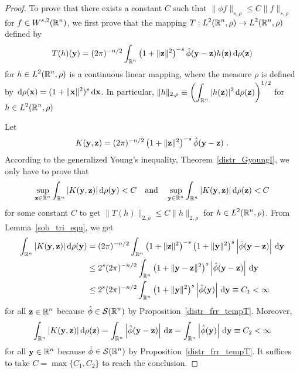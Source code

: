 \begin{proof}
To prove that there exists a constant $C$ such that
$\displaystyle \|\phi f \|_{s,\rho} \leq C \|f\|_{s,\rho}$ for
$\displaystyle f \in W^{s,2}(\mathbb{R}^n)$, we first prove that the mapping 
$\displaystyle T : L^2(\mathbb{R}^n,\rho) \rightarrow L^2(\mathbb{R}^n,\rho)$
defined by
\[
T(h)(\mathbf{y}) =
(2\pi)^{-n/2} \int_{\mathbb{R}^n} \left(1+\|\mathbf{z}\|^2\right)^{-s}
\hat{\phi}(\mathbf{y} - \mathbf{z}) h(\mathbf{z}) \,\mathrm{d}{\rho(\mathbf{z})}
\]
for $\displaystyle h \in L^2(\mathbb{R}^n,\rho)$ is a continuous linear
mapping, where the measure $\rho$ is defined by
$\displaystyle \,\mathrm{d}{\rho(\mathbf{x})} = (1+\|\mathbf{x}\|^2)^s\,\mathrm{d}{\mathbf{x}}$.
In particular,
$\displaystyle \|h\|_{2,\rho} \equiv \left(
\int_{\mathbb{R}^n} |h(\mathbf{z})|^2 \,\mathrm{d}{\rho(\mathbf{z})}\right)^{1/2}$ for
$\displaystyle h \in L^2(\mathbb{R}^n,\rho)$

Let
\[
K(\mathbf{y},\mathbf{z}) =(2\pi)^{-n/2} \left(1+\|\mathbf{z}\|^2\right)^{-s}
\hat{\phi}(\mathbf{y} - \mathbf{z}) \ .
\]
According to the generalized Young's inequality,
Theorem~\ref{distr_GyoungI}, we only have to prove that
\[
\sup_{\mathbf{z}\in\mathbb{R}^n}
\int_{\mathbb{R}^n} |K(\mathbf{y},\mathbf{z})|\,\mathrm{d}{\rho(\mathbf{y})} < C \quad
\text{and} \quad
\sup_{\mathbf{y}\in\mathbb{R}^n}
\int_{\mathbb{R}^n} |K(\mathbf{y},\mathbf{z})|\,\mathrm{d}{\rho(\mathbf{z})} < C
\]
for some constant $C$ to get
$\displaystyle \|T(h) \|_{2,\rho} \leq C \|h\|_{2,\rho}$ for
$\displaystyle h \in L^2(\mathbb{R}^n,\rho)$.  From
Lemma~\ref{sob_tri_equ}, we get
\begin{align*}
\int_{\mathbb{R}^n}|K(\mathbf{y},\mathbf{z})| \,\mathrm{d}{\rho(\mathbf{y})}
&= (2\pi)^{-n/2} \int_{\mathbb{R}^n} \left(1+\|\mathbf{z}\|^2\right)^{-s}
\left(1+\|\mathbf{y}\|^2\right)^{s}
\left|\hat{\phi}(\mathbf{y} - \mathbf{z})\right|\,\mathrm{d}{\mathbf{y}} \\
&\leq 2^s (2\pi)^{-n/2} \int_{\mathbb{R}^n} \left(1+\|\mathbf{y}-\mathbf{z}\|^2\right)^{s}
\left|\hat{\phi}(\mathbf{y} - \mathbf{z})\right|\,\mathrm{d}{\mathbf{y}} \\
&\leq 2^s (2\pi)^{-n/2} \int_{\mathbb{R}^n} \left(1+\|\mathbf{y}\|^2\right)^{s}
\left|\hat{\phi}(\mathbf{y})\right|\,\mathrm{d}{\mathbf{y}} \equiv C_1 < \infty
\end{align*}
for all $\displaystyle \mathbf{z}\in \mathbb{R}^n$ because
$\displaystyle \hat{\phi} \in \mathcal{S}(\mathbb{R}^n)$ by
Proposition~\ref{distr_frr_tempT}.
Moreover,
\[
\int_{\mathbb{R}^n} |K(\mathbf{y}, \mathbf{z})| \,\mathrm{d}{\rho(\mathbf{z})}
= \int_{\mathbb{R}^n} \left|\hat{\phi}(\mathbf{y} - \mathbf{z})\right|\,\mathrm{d}{\mathbf{z}}
= \int_{\mathbb{R}^n} \left|\hat{\phi}(\mathbf{y})\right|\,\mathrm{d}{\mathbf{y}} \equiv C_2
< \infty
\]
for all $\displaystyle \mathbf{y}\in \mathbb{R}^n$ because
$\displaystyle \hat{\phi} \in \mathcal{S}(\mathbb{R}^n)$ by
Proposition~\ref{distr_frr_tempT}.  It suffices to take
$C = \max\{C_1,C_2\}$ to reach the conclusion.


\end{proof}
